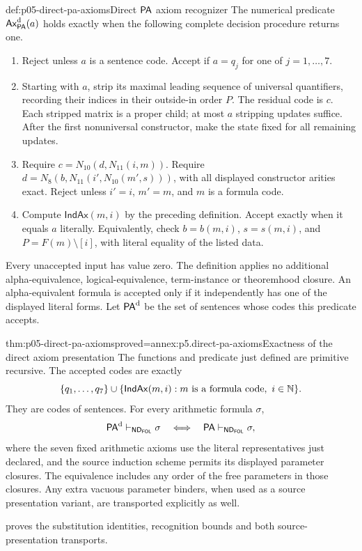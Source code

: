 \begin{hbdefinition}{def:p05-direct-pa-axioms}{Direct \(\mathsf{PA}\) axiom recognizer}
The numerical predicate \(\mathsf{Ax}^{\rm d}_{\mathsf{PA}}(a)\) holds exactly
when the following complete decision procedure returns one.
\begin{enumerate}
\item Reject unless \(a\) is a sentence code.  Accept if
      \(a=q_j\) for one of \(j=1,\ldots,7\).
\item Starting with \(a\), strip its maximal leading sequence of universal
      quantifiers, recording their indices in their outside-in order \(P\).
      The residual code is \(c\).  Each stripped matrix is a proper child;
      at most \(a\) stripping updates suffice.  After the first nonuniversal
      constructor, make the state fixed for all remaining updates.
\item Require \(c=N_{10}(d,N_{11}(i,m))\).  Require
      \(d=N_8(b,N_{11}(i',N_{10}(m',s)))\), with all displayed constructor
      arities exact.  Reject unless \(i'=i\), \(m'=m\), and \(m\)
      is a formula code.
\item Compute \(\mathsf{IndAx}(m,i)\) by the preceding definition.
      Accept exactly when it equals \(a\) literally.  Equivalently, check
      \(b=b(m,i)\), \(s=s(m,i)\), and
      \(P=F(m)\setminus[i]\), with literal equality of the listed data.
\end{enumerate}
Every unaccepted input has value zero.  The definition applies no additional
alpha-equivalence, logical-equivalence, term-instance or theoremhood closure.
An alpha-equivalent formula is accepted only if it independently has one
of the displayed literal forms.  Let \(\mathsf{PA}^{\rm d}\) be the set of
sentences whose codes this predicate accepts.
\end{hbdefinition}

\begin{hbtheorem}{thm:p05-direct-pa-axioms}{proved=annex:p5.direct-pa-axioms}{Exactness of the direct axiom presentation}
The functions and predicate just defined are primitive recursive.  The
accepted codes are exactly
\[
  \{q_1,\ldots,q_7\}\cup
 \{\mathsf{IndAx}(m,i):m\text{ is a formula code},\ i\in\mathbb{N}\}.
\]
They are codes of sentences.  For every arithmetic formula \(\sigma\),
\[
 \mathsf{PA}^{\rm d}\vdash_{\mathsf{ND}_{\mathsf{FOL}}}\sigma
       \quad\Longleftrightarrow\quad
 \mathsf{PA}\vdash_{\mathsf{ND}_{\mathsf{FOL}}}\sigma,
\]
where the seven fixed arithmetic axioms use the literal representatives
just declared, and the source induction scheme permits its displayed
parameter closures.  The equivalence includes any order of the free
parameters in those closures.  Any extra vacuous parameter binders, when
used as a source presentation variant, are transported explicitly as well.
\end{hbtheorem}
 proves the substitution identities,
recognition bounds and both source-presentation transports.

